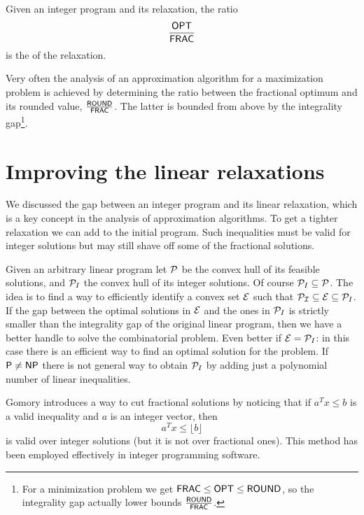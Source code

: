 \documentclass[a4paper,twoside,justified]{tufte-handout}
\begin{document}
\begin{definition}
  Given an integer program and its relaxation, the ratio 
\begin{equation}
  \frac{\mathsf{OPT}}{\mathsf{FRAC}}
\end{equation}
is the  of the relaxation.
\end{definition}

Very often the analysis of an approximation algorithm for a
maximization problem is achieved by determining the ratio between the
fractional optimum and its rounded value, $ \frac{\mathsf{ROUND}}{\mathsf{FRAC}}
$. The latter is bounded from above by the integrality
gap\footnote{For a minimization problem we get $ \mathsf{FRAC} \leq \mathsf{OPT}
  \leq \mathsf{ROUND} $, so the integrality gap actually lower bounds $
  \frac{\mathsf{ROUND}}{\mathsf{FRAC}}$.}.

\section{Improving the linear relaxations}

We discussed the gap between an integer program and its linear
relaxation, which is a key concept in the analysis of approximation
algorithms. To get a tighter relaxation we can add
 to the initial program. Such
inequalities must be valid for integer solutions but may still shave
off some of the fractional solutions.

Given an arbitrary linear program let $ \mathcal{P}$ be the convex hull of
its feasible solutions, and $ \mathcal{P}_{I} $ the convex hull of its
integer solutions. Of course $ \mathcal{P}_{I}\subseteq\mathcal{P} $. The idea
is to find a way to efficiently identify a convex set $ \mathcal{E} $ such
that $ \mathcal{P_{I}}\subseteq \mathcal{E} \subseteq\mathcal{P}_{I} $.  If the
gap between the optimal solutions in $ \mathcal{E} $ and the ones in $
\mathcal{P}_{I} $ is strictly smaller than the integrality gap of the
original linear program, then we have a better handle to solve the
combinatorial problem. Even better if $ \mathcal{E}=\mathcal{P}_{I} $: in this
case there is an efficient way to find an optimal solution for the
problem.
%
If $ \mathsf{P}\neq\mathsf{NP} $ there is not general way to obtain $\mathcal{P}_{I} $
by adding just a polynomial number of linear inequalities.

 Gomory\cite{gomory1958outline}
introduces a way to cut fractional solutions by noticing that if $
a^{T}x \leq b $ is a valid inequality and $ a $ is an integer vector,
then
\begin{equation}
  a^{T}x \leq \lfloor b \rfloor
\end{equation}
is valid over integer solutions (but it is not over fractional
ones). This method has been employed effectively in integer
programming software.
\end{document}
